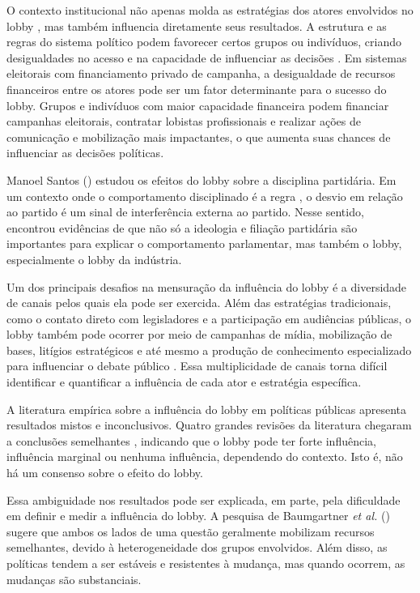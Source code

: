 O contexto institucional não apenas molda as estratégias dos atores envolvidos no lobby \cite{Pop2013Lobbying}, mas também influencia diretamente seus resultados. A estrutura e as regras do sistema político podem favorecer certos grupos ou indivíduos, criando desigualdades no acesso e na capacidade de influenciar as decisões \cite{mahoney_lobbying_2007}.
    Em sistemas eleitorais com financiamento privado de campanha, a desigualdade de recursos financeiros entre os atores pode ser um fator determinante para o sucesso do lobby. Grupos e indivíduos com maior capacidade financeira podem financiar campanhas eleitorais, contratar lobistas profissionais e realizar ações de comunicação e mobilização mais impactantes, o que aumenta suas chances de influenciar as decisões políticas\cite{mahoney_lobbying_2007}.

    Manoel Santos (\citeyear{santos2011parlamento}) estudou os efeitos do lobby sobre a disciplina partidária. Em um contexto onde o comportamento disciplinado é a regra \cite{silva2008sementes}, o desvio em relação ao partido é um sinal de interferência externa ao partido. Nesse sentido, encontrou evidências de que não só a ideologia e filiação partidária são importantes para explicar o comportamento parlamentar, mas também o lobby, especialmente o lobby da indústria.

    Um dos principais desafios na mensuração da influência do lobby é a diversidade de canais pelos quais ela pode ser exercida. Além das estratégias tradicionais, como o contato direto com legisladores e a participação em audiências públicas, o lobby também pode ocorrer por meio de campanhas de mídia, mobilização de bases, litígios estratégicos e até mesmo a produção de conhecimento especializado para influenciar o debate público \cite{dur_measuring_2008}. Essa multiplicidade de canais torna difícil identificar e quantificar a influência de cada ator e estratégia específica.

A literatura empírica sobre a influência do lobby em políticas públicas apresenta resultados mistos e inconclusivos. Quatro grandes revisões da literatura chegaram a conclusões semelhantes \cite{smith1995interest, baumgartner1998basic,burnstein2002, de_figueiredo_advancing_2014}, indicando que o lobby pode ter forte influência, influência marginal ou nenhuma influência, dependendo do contexto. Isto é, não há um consenso sobre o efeito do lobby.

Essa ambiguidade nos resultados pode ser explicada, em parte, pela dificuldade em definir e medir a influência do lobby. A pesquisa de Baumgartner \textit{et al.} (\citeyear{baumgartner2009lobbying}) sugere que ambos os lados de uma questão geralmente mobilizam recursos semelhantes, devido à heterogeneidade dos grupos envolvidos. Além disso, as políticas tendem a ser estáveis e resistentes à mudança, mas quando ocorrem, as mudanças são substanciais.

